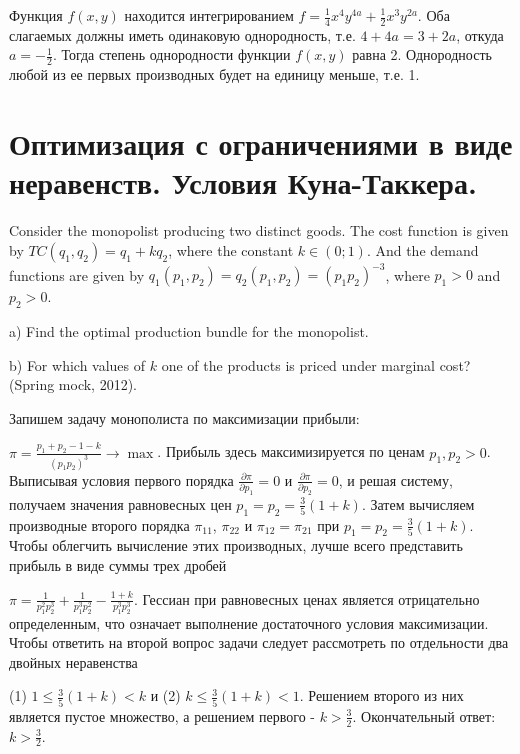 \begin{solution}
Функция $f(x,y)$ находится интегрированием $f=\frac{1}{4} x^{4} y^{4a} +\frac{1}{2} x^{3} y^{2a} $. Оба слагаемых должны иметь одинаковую однородность, т.е. $4+4a=3+2a$, откуда $a=-\frac{1}{2} $. Тогда степень однородности функции $f(x,y)$ равна 2. Однородность любой из ее первых производных будет на единицу меньше, т.е. 1.
\end{solution}




\section{Оптимизация с ограничениями в виде неравенств. Условия Куна-Таккера.}

\begin{problem}
Consider the monopolist producing two distinct goods. The cost function is given by $TC(q_{1} ,q_{2} )=q_{1} +kq_{2} $, where the constant $k\in (0;1)$. And the demand functions are given by $q_{1} (p_{1} ,p_{2} )=q_{2} (p_{1} ,p_{2} )=(p_{1} p_{2} )^{-3} $, where $p_1>0$ and $p_2>0$.

a) Find the optimal production bundle for the monopolist.

b) For which values of  $k$ one of the products is priced under marginal cost? (Spring mock, 2012).
\end{problem}


\begin{solution}
Запишем задачу монополиста по максимизации прибыли:

$\pi =\frac{p_{1} +p_{2} -1-k}{(p_{1} p_{2} )^{3} } \to \max $. Прибыль здесь максимизируется по ценам $p_{1} ,p_{2} >0$. Выписывая условия первого порядка $\frac{\partial \pi }{\partial p_{1} } =0$ и $\frac{\partial \pi }{\partial p_{2} } =0$, и решая систему, получаем значения равновесных цен $p_{1} =p_{2} =\frac{3}{5} (1+k)$. Затем вычисляем производные второго порядка $\pi _{11} $, $\pi _{22} $ и $\pi _{12} =\pi _{21} $ при $p_{1} =p_{2} =\frac{3}{5} (1+k)$. Чтобы облегчить вычисление этих производных, лучше всего представить прибыль в виде суммы трех дробей



$\pi =\frac{1}{p_{1}^{2} p_{2}^{3} } +\frac{1}{p_{1}^{3} p_{2}^{2} } -\frac{1+k}{p_{1}^{3} p_{2}^{3} } $. Гессиан при равновесных ценах является отрицательно определенным, что означает выполнение достаточного условия максимизации. Чтобы ответить на второй вопрос задачи следует рассмотреть по отдельности два двойных неравенства

(1) $1\le \frac{3}{5} (1+k)<k$ и (2) $k\le \frac{3}{5} (1+k)<1$. Решением второго из них является пустое множество, а решением первого - $k>\frac{3}{2} $. Окончательный ответ: $k>\frac{3}{2} $.
\end{solution}



